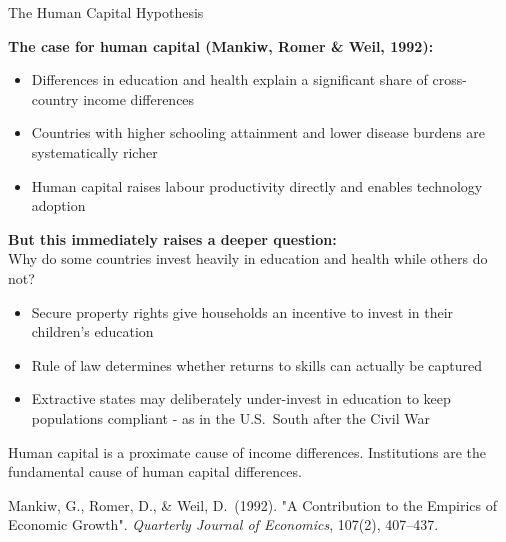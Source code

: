 \documentclass[10pt]{beamer}
\begin{document}
\begin{frame}[allowframebreaks]{The Human Capital Hypothesis}

\textbf{The case for human capital (Mankiw, Romer \& Weil, 1992):}

\begin{itemize}
\item Differences in education and health explain a significant share of cross-country income differences
\item Countries with higher schooling attainment and lower disease burdens are systematically richer
\item Human capital raises labour productivity directly and enables technology adoption
\end{itemize}


\textbf{But this immediately raises a deeper question:}\\
Why do some countries invest heavily in education and health while others do not?

\begin{itemize}
\item Secure property rights give households an incentive to invest in their children's education
\item Rule of law determines whether returns to skills can actually be captured
\item Extractive states may deliberately under-invest in education to keep populations compliant - as in the U.S.\ South after the Civil War
\end{itemize}


\alert{Human capital is a proximate cause of income differences. Institutions are the fundamental cause of human capital differences.}


{\footnotesize Mankiw, G., Romer, D., \& Weil, D.\ (1992). "A Contribution to the Empirics of Economic Growth". \emph{Quarterly Journal of Economics}, 107(2), 407--437.}
\end{frame}
\end{document}
